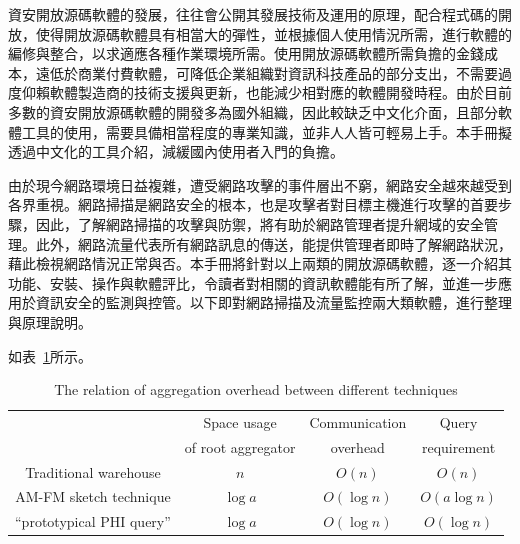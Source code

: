 資安開放源碼軟體的發展，往往會公開其發展技術及運用的原理，配合程式碼的開放，使得開放源碼軟體具有相當大的彈性，並根據個人使用情況所需，進行軟體的編修與整合，以求適應各種作業環境所需。使用開放源碼軟體所需負擔的金錢成本，遠低於商業付費軟體，可降低企業組織對資訊科技產品的部分支出，不需要過度仰賴軟體製造商的技術支援與更新，也能減少相對應的軟體開發時程。由於目前多數的資安開放源碼軟體的開發多為國外組織，因此較缺乏中文化介面，且部分軟體工具的使用，需要具備相當程度的專業知識，並非人人皆可輕易上手。本手冊擬透過中文化的工具介紹，減緩國內使用者入門的負擔。

由於現今網路環境日益複雜，遭受網路攻擊的事件層出不窮，網路安全越來越受到各界重視。網路掃描是網路安全的根本，也是攻擊者對目標主機進行攻擊的首要步驟，因此，了解網路掃描的攻擊與防禦，將有助於網路管理者提升網域的安全管理。此外，網路流量代表所有網路訊息的傳送，能提供管理者即時了解網路狀況，藉此檢視網路情況正常與否。本手冊將針對以上兩類的開放源碼軟體，逐一介紹其功能、安裝、操作與軟體評比，令讀者對相關的資訊軟體能有所了解，並進一步應用於資訊安全的監測與控管。以下即對網路掃描及流量監控兩大類軟體，進行整理與原理說明。
	
如表~\ref{tab:system}所示。 


\begin{table}[hbtp]
  \begin{center}
    \caption{The relation of aggregation overhead between different techniques}
    \label{tab:system}
    \begin{tabular}{|c|c c c|}
      \hline
       & Space usage & Communication & Query \\
       & of root aggregator & overhead & requirement \\
      \hline
      Traditional warehouse & $n$ & $O(n)$ & $O(n)$ \\
      \hline
      AM-FM sketch technique & $\log a$ & $O(\log n)$ &  $O(a\log n)$ \\
      \hline
      ``prototypical PHI query'' & $\log a$ & $O(\log n)$ & $O(\log n)$ \\
      \hline
      \end{tabular}
  \end{center}
\end{table}
